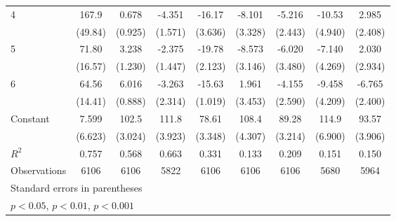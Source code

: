 \documentclass{article}
\begin{document}
{\begin{longtable}{l*{8}{c}}
4               &    167.9\sym{**} &    0.678         &   -4.351\sym{**} &   -16.17\sym{***}&   -8.101\sym{*}  &   -5.216\sym{*}  &   -10.53\sym{*}  &    2.985         \\
                &  (49.84)         &  (0.925)         &  (1.571)         &  (3.636)         &  (3.328)         &  (2.443)         &  (4.940)         &  (2.408)         \\
5               &    71.80\sym{***}&    3.238\sym{*}  &   -2.375         &   -19.78\sym{***}&   -8.573\sym{**} &   -6.020         &   -7.140         &    2.030         \\
                &  (16.57)         &  (1.230)         &  (1.447)         &  (2.123)         &  (3.146)         &  (3.480)         &  (4.269)         &  (2.934)         \\
6               &    64.56\sym{***}&    6.016\sym{***}&   -3.263         &   -15.63\sym{***}&    1.961         &   -4.155         &   -9.458\sym{*}  &   -6.765\sym{**} \\
                &  (14.41)         &  (0.888)         &  (2.314)         &  (1.019)         &  (3.453)         &  (2.590)         &  (4.209)         &  (2.400)         \\
Constant        &    7.599         &    102.5\sym{***}&    111.8\sym{***}&    78.61\sym{***}&    108.4\sym{***}&    89.28\sym{***}&    114.9\sym{***}&    93.57\sym{***}\\
                &  (6.623)         &  (3.024)         &  (3.923)         &  (3.348)         &  (4.307)         &  (3.214)         &  (6.900)         &  (3.906)         \\
\hline
\(R^{2}\)       &    0.757         &    0.568         &    0.663         &    0.331         &    0.133         &    0.209         &    0.151         &    0.150         \\
Observations    &     6106         &     6106         &     5822         &     6106         &     6106         &     6106         &     5680         &     5964         \\
\hline\hline
\multicolumn{9}{l}{\footnotesize Standard errors in parentheses}\\
\multicolumn{9}{l}{\footnotesize \sym{*} \(p<0.05\), \sym{**} \(p<0.01\), \sym{***} \(p<0.001\)}\\
\end{longtable}
}
\end{document}
